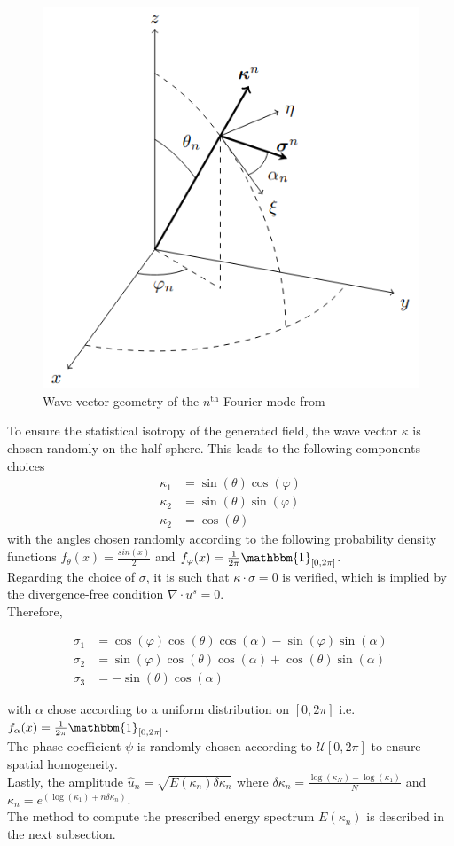 \documentclass[a4paper,12pt]{article}
\theoremstyle{definition}
\begin{document}
\begin{figure}[H]
    \centering
    \includegraphics[width=0.5\linewidth]{illustrations/WaveVectorGeometry.png}
    \caption{Wave vector geometry of the $n^\text{th}$ Fourier mode from \cite{Janin2021}}
    \label{WaveVectorGeometry}
\end{figure}
To ensure the statistical isotropy of the generated field, the wave vector $\kappa$ is chosen randomly on the half-sphere.
This leads to the following components choices
\begin{align}
    \kappa_1 &= \sin(\theta)\cos(\varphi) \label{kappa1}\\ 
    \kappa_2 &= \sin(\theta)\sin(\varphi) \label{kappa2}\\
    \kappa_2 & = \cos(\theta) \label{kappa3}
\end{align}
with the angles chosen randomly according to the following probability density functions $f_\theta(x)=\frac{sin(x)}{2}$ and $f_\varphi(x)=\frac{1}{2\pi}\mathbbm{1}_{[0,2\pi]}$. \\
Regarding the choice of $\sigma$, it is such that $\kappa\cdot\sigma=0$ is verified, which is implied by the divergence-free condition $\nabla\cdot u^s=0$. \\
Therefore, 

\begin{align}
    \sigma_1&=\cos(\varphi)\cos(\theta)\cos(\alpha)-\sin(\varphi)\sin(\alpha) \label{sigma1}\\
    \sigma_2&=\sin(\varphi)\cos(\theta)\cos(\alpha)+\cos(\theta)\sin(\alpha) \label{sigma2}\\
    \sigma_3&=-\sin(\theta)\cos(\alpha) \label{sigma3}
\end{align}

with $\alpha$ chose according to a uniform distribution on $[0,2\pi]$ i.e. $f_\alpha(x)=\frac{1}{2\pi}\mathbbm{1}_{[0,2\pi]}$. \\
The phase coefficient $\psi$ is randomly chosen according to $\mathcal{U}[0,2\pi]$ to ensure spatial homogeneity. \\
Lastly, the amplitude $\hat{u}_n=\sqrt{E(\kappa_n)\delta \kappa_n}$ where $\delta \kappa_n = \frac{\log(\kappa_N)-\log(\kappa_1)}{N}$ and $\kappa_n=e^{(\log(\kappa_1)+n\delta \kappa_n)}$. \\
The method to compute the prescribed energy spectrum $E(\kappa_n)$ is described in the next subsection.
\end{document}
